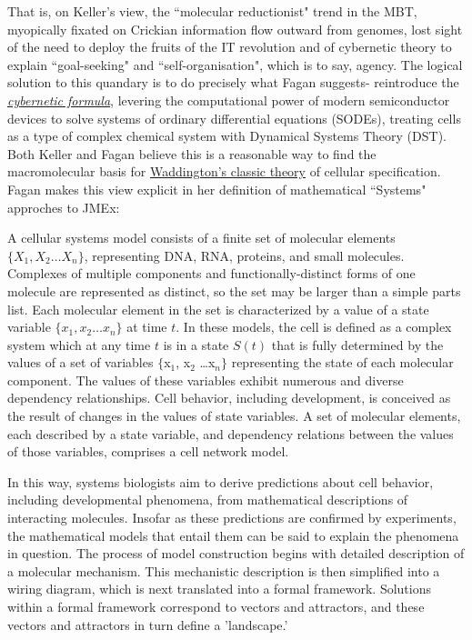 That is, on Keller's view, the ``molecular reductionist" trend in the MBT, myopically fixated on Crickian information flow outward from genomes, lost sight of the need to deploy the fruits of the IT revolution and of cybernetic theory to explain ``goal-seeking" and ``self-organisation", which is to say, agency. The logical solution to this quandary is to do precisely what Fagan suggests- reintroduce the \hyperref[cybernetics]{\textit{cybernetic formula}}, levering the computational power of modern semiconductor devices to solve systems of ordinary differential equations (SODEs), treating cells as a type of complex chemical system with Dynamical Systems Theory (DST). Both Keller and Fagan believe this is a reasonable way to find the macromolecular basis for \hyperref[Waddington]{Waddington's classic theory} of cellular specification. Fagan makes this view explicit in her definition of mathematical ``Systems" approches to JMEx:
 
\begin{longquote}
A cellular systems model consists of a finite set of molecular elements
$\{X_1, X_2 … X_n \}$, representing DNA, RNA, proteins, and small molecules.
Complexes of multiple components and functionally-distinct forms of
one molecule are represented as distinct, so the set may be larger than
a simple parts list. Each molecular element in the set is characterized by
a value of a state variable $\{x_1 , x_2 \ldots x_n\}$ at time $t$. In these models, the cell
is defined as a complex system which at any time $t$ is in a state $S(t)$ that
is fully determined by the values of a set of variables $\{$x$_1$, x$_2$ \ldots x$_n \}$ representing the state of each molecular component. The values of these
variables exhibit numerous and diverse dependency relationships. Cell
behavior, including development, is conceived as the result of changes in
the values of state variables. A set of molecular elements, each described
by a state variable, and dependency relations between the values of those
variables, comprises a cell network model.

In this way, systems biologists aim to derive predictions about cell
behavior, including developmental phenomena, from mathematical
descriptions of interacting molecules. Insofar as these predictions are
confirmed by experiments, the mathematical models that entail them
can be said to explain the phenomena in question. The process of model
construction begins with detailed description of a molecular mechanism.
This mechanistic description is then simplified into a wiring diagram,
which is next translated into a formal framework. Solutions within a
formal framework correspond to vectors and attractors, and these vectors
and attractors in turn define a 'landscape.'
\cite[p.204]{Fagan2013}
\end{longquote}

